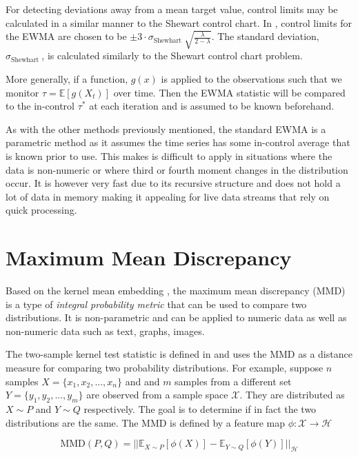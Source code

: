 For detecting deviations away from a mean target value, control limits may be calculated in a similar manner to the Shewart control chart. In \cite{hunter1986exponentially}, control limits for the EWMA are chosen to be  $\pm 3 \cdot \sigma_{\text {Shewhart }} \sqrt{\frac{\lambda}{2-\lambda}}$. The standard deviation, $\sigma_{\text {Shewhart }}$, is calculated similarly to the Shewart control chart problem. %

More generally, if a function, $g(x)$ is applied to the observations such that we monitor $\tau= \mathbb{E}[g(X_t)]$ over time. Then the EWMA statistic will be compared to the in-control $\tau^*$ at each iteration and is assumed to be known beforehand.  

As with the other methods previously mentioned, the standard EWMA is a parametric method as it assumes the time series has some in-control average that is known prior to use. This makes is difficult to apply in situations where the data is non-numeric or where third or fourth moment changes in the distribution occur. It is however very fast due to its recursive structure and does not hold a lot of data in memory making it appealing for live data streams that rely on quick processing.

\section{Maximum Mean Discrepancy}
\label{mmd}
Based on the kernel mean embedding , the maximum mean discrepancy (MMD) is a type of \textit{integral probability metric} that can be used to compare two distributions. It is non-parametric and can be applied to numeric data as well as non-numeric data such as text, graphs, images.

The two-sample kernel test statistic is defined in \cite{gretton2012kernel} and uses the MMD as a distance measure for comparing two probability distributions. For example, suppose $n$ samples $X = \{x_1, x_2, ..., x_n\}$ and and $m$ samples from a different set $Y=\{y_1, y_2, ..., y_m\}$ are observed from a sample space $\mathcal{X}$. They are distributed as $X \sim  P$ and $Y \sim Q$ respectively. The goal is to determine if in fact the two distributions are the same. The MMD is defined by a feature map $\phi: \mathcal{X} \rightarrow \mathcal{H}$

$$\text{MMD}(P,Q)=|| \mathbb{E}_{X \sim P}[\phi(X)] -  \mathbb{E}_{Y \sim Q}[\phi(Y)]||_\mathcal{H}$$

